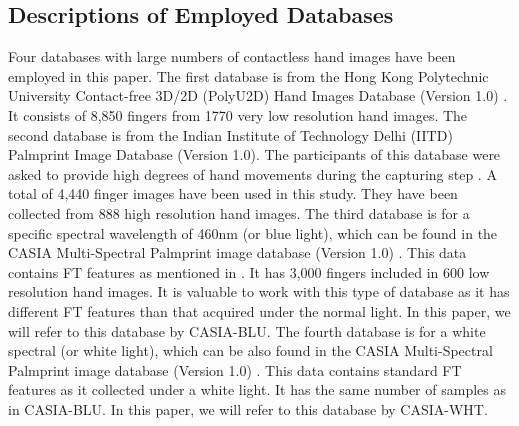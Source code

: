 \documentclass[conference]{IEEEtran}
\begin{document}
\subsection{Descriptions of Employed Databases}
Four databases with large numbers of contactless hand images have been employed in this paper. The first database is from the Hong Kong Polytechnic University Contact-free 3D/2D (PolyU2D) Hand Images Database (Version 1.0) \cite{Databasever1PolyU3D2D}. It consists of 8,850 fingers from 1770 very low resolution hand images. The second database is from the Indian Institute of Technology Delhi (IITD) Palmprint Image Database (Version 1.0). The participants of this database were asked to provide high degrees of hand movements during the capturing step \cite{IIT-Delhi-PalmprintV1} \cite{kumar2008incorporating}. A total of 4,440 finger images have been used in this study. They have been collected from 888 high resolution hand images. The third database is for a specific spectral wavelength of 460nm (or blue light), which can be found in the CASIA Multi-Spectral Palmprint image database (Version 1.0) \cite{CASIAMS-PalmprintV1}. This data contains FT features as mentioned in \cite{Khan2011Contour}\cite{khan2014multispectral}. It has 3,000 fingers included in 600 low resolution hand images. It is valuable to work with this type of database as it has different FT features than that acquired under the normal light. In this paper, we will refer to this database by CASIA-BLU. The fourth database is for a white spectral (or white light), which can be also found in the CASIA Multi-Spectral Palmprint image database (Version 1.0) \cite{CASIAMS-PalmprintV1}. This data contains standard FT features as it collected under a white light. It has the same number of samples as in CASIA-BLU. In this paper, we will refer to this database by CASIA-WHT. 
\end{document}

